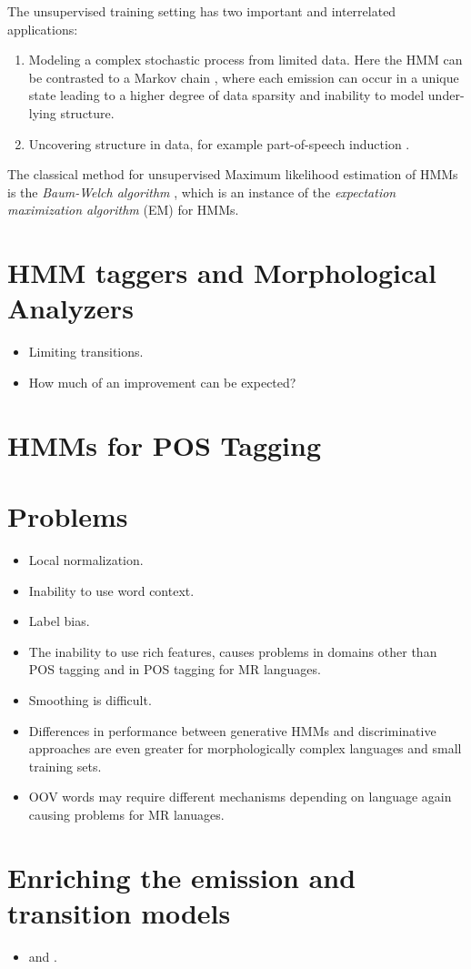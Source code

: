 The unsupervised training setting has two important and
interrelated applications:
\begin{enumerate}
\item Modeling a complex stochastic process from limited data. Here
  the HMM can be contrasted to a Markov chain \citep[318--320]{Manning1999}, where
  each emission can occur in a unique state leading to a higher degree
  of data sparsity and inability to model under-lying structure.
\item Uncovering structure in data, for example part-of-speech
  induction \citep{Johnson2007}.
\end{enumerate}
The classical method for unsupervised Maximum likelihood estimation of
HMMs is the {\it Baum-Welch algorithm} \citep{Rabiner1989}, which is
an instance of the {\it expectation maximization algorithm} (EM)
\citep{Dempster1977} for HMMs.

\section{HMM taggers and Morphological Analyzers}
\begin{itemize}
\item Limiting transitions.
\item How much of an improvement can be expected?
\end{itemize}


\section{HMMs for POS Tagging}

\section{Problems}
\begin{itemize}
\item Local normalization.
\item Inability to use word context.
\item Label bias.
\item The inability to use rich features, causes problems in domains
  other than POS tagging and in POS tagging for MR languages.
\item Smoothing is difficult.
\item Differences in performance between generative HMMs and
  discriminative approaches are even greater for morphologically
  complex languages and small training sets.
\item OOV words may require different mechanisms depending on
  language again causing problems for MR lanuages.
\end{itemize}

\section{Enriching the emission and transition models}
\begin{itemize}
\item \cite{Halacsy2007} and \cite{Silfverberg2011}.
\end{itemize}
